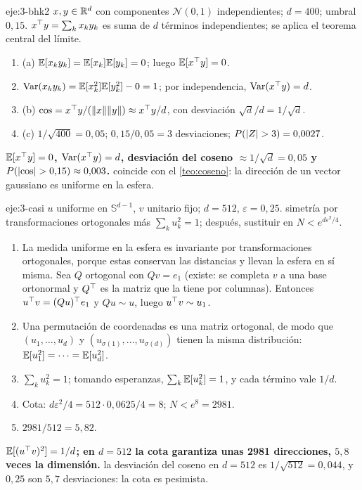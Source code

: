 \begin{solucion}{eje:3-bhk2}
\datos $x,y\in\mathbb{R}^{d}$ con componentes $\mathcal{N}(0,1)$ independientes; $d=400$; umbral $0{,}15$.
\planteamiento $x^{\top} y=\sum_kx_ky_k$ es suma de $d$ términos independientes; se aplica el teorema central del límite.
\pasos
\begin{enumerate}[label=\arabic*.]
  \item (a) $\mathbb{E}[x_ky_k]=\mathbb{E}[x_k]\mathbb{E}[y_k]=0$; luego $\mathbb{E}[x^{\top} y]=0$.
  \item $\operatorname{Var}(x_ky_k)=\mathbb{E}[x_k^{2}]\mathbb{E}[y_k^{2}]-0=1$; por independencia, $\operatorname{Var}(x^{\top} y)=d$.
  \item (b) $\cos=x^{\top} y/(\lVert x\rVert\lVert y\rVert)\approx x^{\top} y/d$, con desviación $\sqrt d/d=1/\sqrt d$.
  \item (c) $1/\sqrt{400}=0{,}05$; $0{,}15/0{,}05=3$ desviaciones; $P(\lvert Z\rvert>3)=0{,}0027$.
\end{enumerate}
\resultado \textbf{$\mathbb{E}[x^{\top} y]=0$, $\operatorname{Var}(x^{\top} y)=d$, desviación del coseno $\approx 1/\sqrt d=0{,}05$ y $P(\lvert\cos\rvert>0{,}15)\approx 0{,}003$.}
\comprobacion coincide con el \cref{teo:coseno}: la dirección de un vector gaussiano es uniforme en la esfera.
\end{solucion}

\begin{solucion}{eje:3-casi}
\datos $u$ uniforme en $\mathbb{S}^{d-1}$, $v$ unitario fijo; $d=512$, $\varepsilon=0{,}25$.
\planteamiento simetría por transformaciones ortogonales más $\sum_ku_k^{2}=1$; después, sustituir en $N<e^{d\varepsilon^{2}/4}$.
\pasos
\begin{enumerate}[label=\arabic*.]
  \item La medida uniforme en la esfera es invariante por transformaciones ortogonales, porque estas conservan las distancias y llevan la esfera en sí misma. Sea $Q$ ortogonal con $Qv=e_1$ (existe: se completa $v$ a una base ortonormal y $Q^{\top}$ es la matriz que la tiene por columnas). Entonces $u^{\top} v=(Qu)^{\top} e_1$ y $Qu\sim u$, luego $u^{\top} v\sim u_1$.
  \item Una permutación de coordenadas es una matriz ortogonal, de modo que $(u_1,\dots,u_d)$ y $(u_{\sigma(1)},\dots,u_{\sigma(d)})$ tienen la misma distribución: $\mathbb{E}[u_1^{2}]=\dots=\mathbb{E}[u_d^{2}]$.
  \item $\sum_ku_k^{2}=1$; tomando esperanzas, $\sum_k\mathbb{E}[u_k^{2}]=1$, y cada término vale $1/d$.
  \item Cota: $d\varepsilon^{2}/4=512\cdot 0{,}0625/4=8$; $N<e^{8}=2981$.
  \item $2981/512=5{,}82$.
\end{enumerate}
\resultado \textbf{$\mathbb{E}[(u^{\top} v)^{2}]=1/d$; en $d=512$ la cota garantiza unas 2981 direcciones, $5{,}8$ veces la dimensión.}
\comprobacion la desviación del coseno en $d=512$ es $1/\sqrt{512}=0{,}044$, y $0{,}25$ son $5{,}7$ desviaciones: la cota es pesimista.
\end{solucion}

